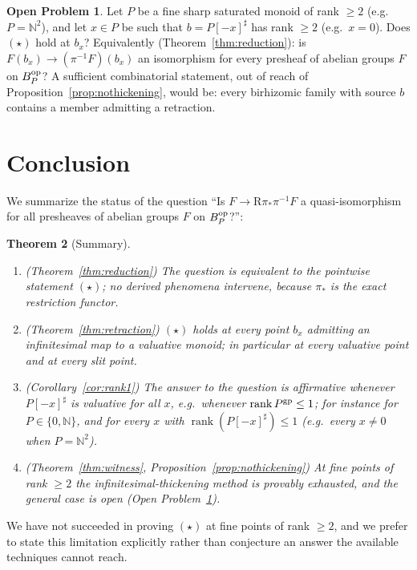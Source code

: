 \documentclass[11pt]{amsart}
\theoremstyle{plain}
\newtheorem{theorem}{Theorem}[section]
\theoremstyle{remark}
\theoremstyle{definition}
\newtheorem{openproblem}[theorem]{Open Problem}
\numberwithin{equation}{section}
\begin{document}
\begin{openproblem}\label{op:main}
Let $P$ be a fine sharp saturated monoid of rank $\ge2$ (e.g.\
$P=\mathbb N^2$), and let $x\in P$ be such that $b=P[-x]^\sharp$ has
rank $\ge2$ (e.g.\ $x=0$).  Does $(\star)$ hold at $b_x$?  Equivalently
(Theorem~\ref{thm:reduction}): is $F(b_x)\to(\pi^{-1}F)(b_x)$ an
isomorphism for every presheaf of abelian groups $F$ on $B_P^{\rm op}$?
A sufficient combinatorial statement, out of reach of
Proposition~\ref{prop:nothickening}, would be: every birhizomic family
with source $b$ contains a member admitting a retraction.
\end{openproblem}

\section{Conclusion}

We summarize the status of the question
``Is $F\to\mathrm R\pi_*\pi^{-1}F$ a quasi-isomorphism for all presheaves
of abelian groups $F$ on $B_P^{\rm op}$?'':

\begin{theorem}[Summary]
\begin{enumerate}
\item (Theorem~\ref{thm:reduction}) The question is equivalent to the
pointwise statement $(\star)$; no derived phenomena intervene, because
$\pi_*$ is the exact restriction functor.
\item (Theorem~\ref{thm:retraction}) $(\star)$ holds at every point
$b_x$ admitting an infinitesimal map to a valuative monoid; in
particular at every valuative point and at every slit point.
\item (Corollary~\ref{cor:rank1}) The answer to the question is
\emph{affirmative} whenever $P[-x]^\sharp$ is valuative for all $x$, e.g.\
whenever $\operatorname{rank}P^{\rm gp}\le1$; for instance for
$P\in\{0,\mathbb N\}$, and for every $x$ with
$\operatorname{rank}(P[-x]^\sharp)\le1$ (e.g.\ every $x\neq0$ when
$P=\mathbb N^2$).
\item (Theorem~\ref{thm:witness}, Proposition~\ref{prop:nothickening})
At fine points of rank $\ge2$ the infinitesimal-thickening method is
provably exhausted, and the general case is open
(Open Problem~\ref{op:main}).
\end{enumerate}
\end{theorem}

We have not succeeded in proving $(\star)$ at fine points of rank
$\ge2$, and we prefer to state this limitation explicitly rather than
conjecture an answer the available techniques cannot reach.
\end{document}
